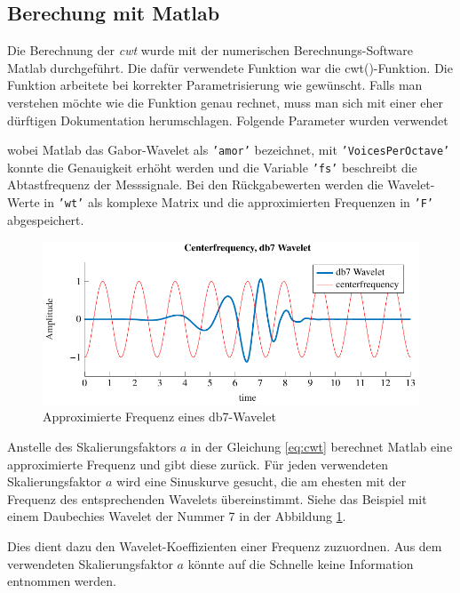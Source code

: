 \begin{refsection}
\subsection{Berechung mit Matlab}
\label{matlab}
Die Berechnung der \textit{cwt} wurde mit der numerischen Berechnungs-Software Matlab durchgeführt.
Die dafür verwendete Funktion war die cwt()-Funktion.
Die Funktion arbeitete bei korrekter Parametrisierung wie gewünscht.
Falls man verstehen möchte wie die Funktion genau rechnet, muss man sich mit einer eher dürftigen Dokumentation herumschlagen.
Folgende Parameter wurden verwendet

\label{fig:matlab_code_cwt}
wobei Matlab das Gabor-Wavelet als \texttt{'amor'} bezeichnet, mit \texttt{'VoicesPerOctave'} konnte die Genauigkeit erhöht werden und die Variable \texttt{'fs'} beschreibt die Abtastfrequenz der Messsignale.
Bei den Rückgabewerten werden die Wavelet-Werte in \texttt{'wt'} als komplexe Matrix und die approximierten Frequenzen in \texttt{'F'} abgespeichert.

\begin{figure}[h]
	\centering
	\includegraphics[width=1\textwidth]{papers/wwt/images/centerf.pdf}
	\caption{Approximierte Frequenz eines db7-Wavelet}
	\label{fig:centerf}
\end{figure}


Anstelle des Skalierungsfaktors $a$ in der Gleichung \ref{eq:cwt} berechnet Matlab eine approximierte Frequenz und gibt diese zurück.
Für jeden verwendeten Skalierungsfaktor $a$ wird eine Sinuskurve gesucht, die am ehesten mit der Frequenz des entsprechenden Wavelets übereinstimmt.
Siehe das Beispiel mit einem Daubechies Wavelet der Nummer 7 in der Abbildung \ref{fig:centerf}.


Dies dient dazu den Wavelet-Koeffizienten einer Frequenz zuzuordnen. 
Aus dem verwendeten Skalierungsfaktor $a$ könnte auf die Schnelle keine Information entnommen werden.



\end{refsection}
